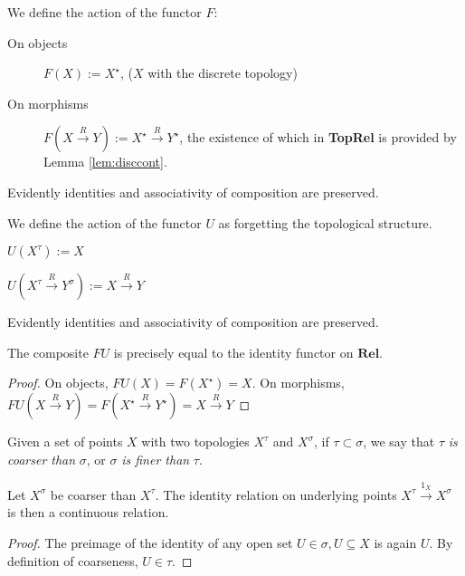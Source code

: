 \begin{defn} We define the action of the functor $F$:
\begin{description}
\item[On objects] $F(X) := X^\star$, ($X$ with the discrete topology)
\item[On morphisms] $F(X \overset{R}{\rightarrow} Y) := X^\star \overset{R}{\rightarrow} Y^\star$, the existence of which in \textbf{TopRel} is provided by Lemma \ref{lem:disccont}.
\end{description}
Evidently identities and associativity of composition are preserved.
\end{defn}

\begin{defn}
\begin{description} We define the action of the functor $U$ as forgetting the topological structure.
\item[On objects] $U(X^\tau) := X$
\item[On morphisms] $U(X^\tau \overset{R}{\rightarrow} Y^\sigma) := X \overset{R}{\rightarrow} Y$
\end{description}
Evidently identities and associativity of composition are preserved.
\end{defn}


\begin{lemma}[$FU = 1_{\textbf{Rel}}$]\label{lem:idadj}
The composite $FU$ is precisely equal to the identity functor on $\mathbf{Rel}$.
\begin{proof}
On objects, $FU(X) = F(X^\star) = X$. On morphisms, $FU(X \overset{R}{\rightarrow} Y) = F(X^\star \overset{R}{\rightarrow} Y^\star) = X \overset{R}{\rightarrow} Y$
\end{proof}
\end{lemma}

\begin{rem}
Given a set of points $X$ with two topologies $X^\tau$ and $X^\sigma$, if $\tau \subset \sigma$, we say that $\tau$ \emph{is coarser than} $\sigma$, or $\sigma$ \emph{is finer than} $\tau$.
\end{rem}

\begin{lemma}\label{lem:coarse}
Let $X^\sigma$ be coarser than $X^\tau$. The identity relation on underlying points $X^\tau \overset{1_X}{\rightarrow} X^\sigma$ is then a continuous relation.
\begin{proof}
The preimage of the identity of any open set $U \in \sigma, U \subseteq X$ is again $U$. By definition of coarseness, $U \in \tau$.
\end{proof}
\end{lemma}

